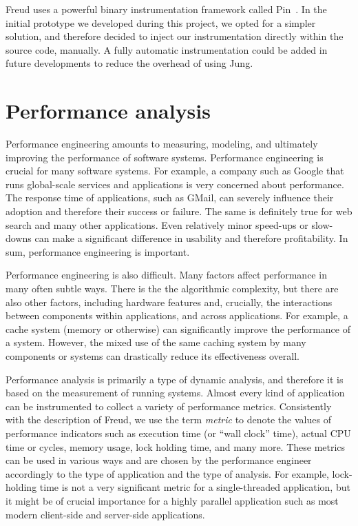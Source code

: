 \documentclass[11pt,english,singlespacing,headsepline,consistentlayout]{auxiliary/si-msc-thesis}
\begin{document}
Freud uses a powerful binary instrumentation framework called
Pin~\cite{PIN}.  In the initial prototype we developed during this
project, we opted for a simpler solution, and therefore decided to
inject our instrumentation directly within the source code, manually.
A fully automatic instrumentation could be added in future
developments to reduce the overhead of using Jung.


\chapter{Performance analysis}


Performance engineering amounts to measuring, modeling, and ultimately
improving the performance of software systems.  Performance
engineering is crucial for many software systems.  For example, a
company such as Google that runs global-scale services and
applications is very concerned about performance.  The response time
of applications, such as GMail, can severely influence their adoption
and therefore their success or failure.  The same is definitely true
for web search and many other applications.  Even relatively minor
speed-ups or slow-downs can make a significant difference in usability
and therefore profitability.  In sum, performance engineering is
important.

Performance engineering is also difficult.  Many factors affect
performance in many often subtle ways.  There is the the algorithmic
complexity, but there are also other factors, including hardware
features and, crucially, the interactions between components within
applications, and across applications.  For example, a cache system
(memory or otherwise) can significantly improve the performance of a
system.  However, the mixed use of the same caching system by many
components or systems can drastically reduce its effectiveness
overall.

Performance analysis is primarily a type of dynamic analysis, and
therefore it is based on the measurement of running systems.  Almost
every kind of application can be instrumented to collect a variety of
performance metrics.  Consistently with the description of Freud, we
use the term \emph{metric} to denote the values of performance
indicators such as execution time (or ``wall clock'' time), actual CPU
time or cycles, memory usage, lock holding time, and many more.  These
metrics can be used in various ways and are chosen by the performance
engineer accordingly to the type of application and the type of
analysis.  For example, lock-holding time is not a very significant metric
for a single-threaded application, but it might be of crucial
importance for a highly parallel application such as most modern
client-side and server-side applications.
\end{document}
